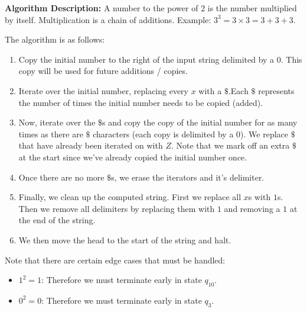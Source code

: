 \documentclass[12pt]{article}
\begin{document}
\begin{spacing}{1.5}
\begin{enumerate}
\begin{enumerate}
                              \textbf{Algorithm Description:}
                              A number to the power of 2 is the number multiplied by itself. Multiplication is a chain of additions. Example: $3^3 = 3\times 3 = 3 + 3 + 3$.

                              The algorithm is as follows:
                              \begin{enumerate}
                                    \item Copy the initial number to the right of the input string delimited by a $0$. This copy will be used for future additions / copies.
                                    \item Iterate over the initial number, replacing every $x$ with a $\$$.Each $\$$ represents the number of times the initial number needs to be copied (added).
                                    \item Now, iterate over the $\$$s and copy the copy of the initial number for as many times as there are $\$$ characters (each copy is delimited by a $0$). We replace $\$$ that have already been iterated on with $Z$. Note that we mark off an extra $\$$ at the start since we've already copied the initial number once.
                                    \item Once there are no more $\$$s, we erase the iterators and it's delimiter.
                                    \item Finally, we clean up the computed string. First we replace all $x$s with $1$s. Then we remove all delimiters by replacing them with $1$ and removing a $1$ at the end of the string.
                                    \item We then move the head to the start of the string and halt.
                              \end{enumerate}

                              Note that there are certain edge cases that must be handled:
                              \begin{itemize}
                                    \item $1^2=1$: Therefore we must terminate early in state $q_{10}$.
                                    \item $0^2=0$: Therefore we must terminate early in state $q_3$.
                              \end{itemize}


\end{enumerate}
\end{enumerate}
\end{spacing}
\end{document}
